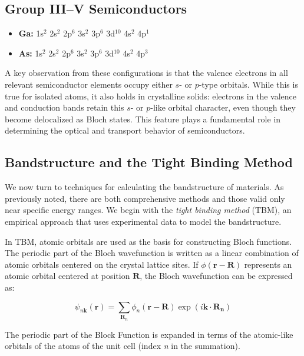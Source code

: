 \subsection*{Group III–V Semiconductors}

\begin{itemize}
	\item \textbf{Ga:} \quad 1s$^2$ 2s$^2$ 2p$^6$ 3s$^2$ 3p$^6$ 3d$^{10}$ 4s$^2$ 4p$^1$
	\item \textbf{As:} \quad 1s$^2$ 2s$^2$ 2p$^6$ 3s$^2$ 3p$^6$ 3d$^{10}$ 4s$^2$ 4p$^3$
\end{itemize}

A key observation from these configurations is that the valence electrons in all relevant semiconductor elements occupy either $s$- or $p$-type orbitals. While this is true for isolated atoms, it also holds in crystalline solids: electrons in the valence and conduction bands retain this $s$- or $p$-like orbital character, even though they become delocalized as Bloch states. This feature plays a fundamental role in determining the optical and transport behavior of semiconductors.

\subsection*{Bandstructure and the Tight Binding Method}

We now turn to techniques for calculating the bandstructure of materials. As previously noted, there are both comprehensive methods and those valid only near specific energy ranges. We begin with the \textit{tight binding method} (TBM), an empirical approach that uses experimental data to model the bandstructure.

In TBM, atomic orbitals are used as the basis for constructing Bloch functions. The periodic part of the Bloch wavefunction is written as a linear combination of atomic orbitals centered on the crystal lattice sites. If \( \phi(\mathbf{r} - \mathbf{R}) \) represents an atomic orbital centered at position \( \mathbf{R} \), the Bloch wavefunction can be expressed as:

\begin{equation*}
	\psi_{n\mathbf{k}}(\mathbf{r}) = \sum_{\mathbf{R}_n} \phi_n(\mathbf{r} - \mathbf{R}) \exp(i\mathbf{k} \cdot \mathbf{R_n})
\end{equation*}

The periodic part of the Block Function is expanded in terms of the atomic-like orbitals of the atoms of the unit cell (index \textit{n} in the summation).


